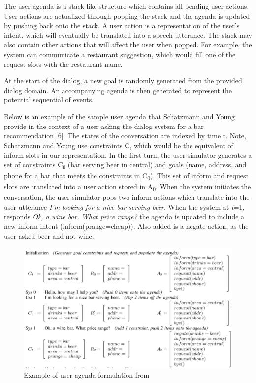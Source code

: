 The user agenda is a stack-like structure which contains all pending user actions. User actions are actualized through popping the stack and the agenda is updated by pushing back onto the stack. A user action is a representation of the user’s intent, which will eventually be translated into a speech utterance. The stack may also contain other actions that will affect the user when popped. For example, the system can communicate a restaurant suggestion, which would fill one of the request slots with the restaurant name.  

At the start of the dialog, a new goal is randomly generated from the provided dialog domain. An accompanying agenda is then generated to represent the potential sequential of events. 

Below is an example of the sample user agenda that Schatzmann and Young provide in the context of a user asking the dialog system for a bar recommendation [6]. The states of the conversation are indexed by time t. Note, Schatzmann and Young use constraints C, which would be the equivalent of inform slots in our representation. In the first turn, the user simulator generates a set of constraints C\textsubscript{0} (bar serving beer in central) and goals (name, address, and phone for a bar that meets the constraints in C\textsubscript{0}). This set of inform and request slots are translated into a user action stored in A\textsubscript{0}. When the system initiates the conversation, the user simulator pops two inform actions which translate into the user utterance \textit{I’m looking for a nice bar serving beer}. When the system at \textit{t}=1, responds \textit{Ok, a wine bar. What price range?} the agenda is updated to include a new inform intent (inform(prange=cheap)). Also added is a negate action, as the user asked beer and not wine. 

\begin{figure}[h!]
	\centering
	\includegraphics[scale=.25]{diagrams/ageda_ex2.jpeg}
	\caption{ Example of user agenda formulation from \cite{Schatzmann2009TheHA} }
	\label{fig:speaker_class}
\end{figure}


